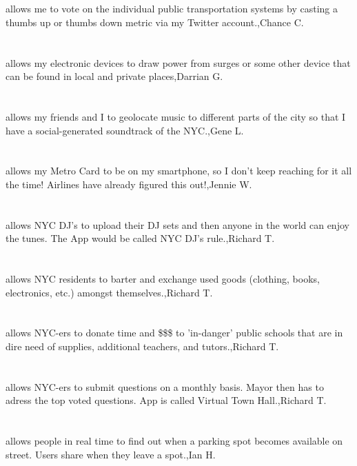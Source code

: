 \section{}allows me to vote on the individual public transportation systems by casting a thumbs up or thumbs down metric via my Twitter account.,Chance C.
\section{}allows my electronic devices to draw power from surges or some other device that can be found in local and private places,Darrian G.
\section{}allows my friends and I to geolocate music to different parts of the city so that I have a social-generated soundtrack of the NYC.,Gene L.
\section{}allows my Metro Card to be on my smartphone, so I don't keep reaching for it all the time!  Airlines have already figured this out!,Jennie W.
\section{}allows NYC DJ's to upload their DJ sets and then anyone in the world can enjoy the tunes. The App would be called NYC DJ's rule.,Richard T.
\section{}allows NYC residents to barter and exchange used goods (clothing, books, electronics, etc.) amongst themselves.,Richard T.
\section{}allows NYC-ers to donate time and \$\$\$ to 'in-danger' public schools that are in dire need of supplies, additional teachers, and tutors.,Richard T.
\section{}allows NYC-ers to submit questions on a monthly basis. Mayor then has to adress the top voted questions. App is called Virtual Town Hall.,Richard T.
\section{}allows people in real time to find out when a parking spot becomes available on street. Users share when they leave a spot.,Ian H.

